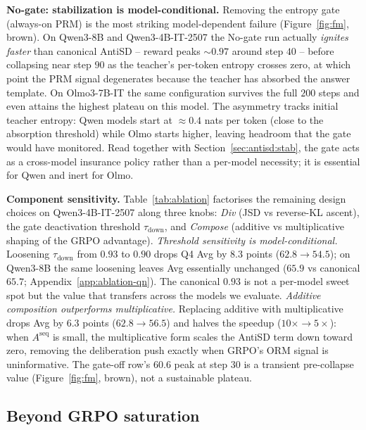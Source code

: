 \documentclass{article}
\begin{document}
\textbf{No-gate: stabilization is model-conditional.} Removing the entropy gate (always-on PRM) is the most striking model-dependent failure (Figure~\ref{fig:fm}, brown). On Qwen3-8B and Qwen3-4B-IT-2507 the No-gate run actually \emph{ignites faster} than canonical AntiSD -- reward peaks $\sim 0.97$ around step $40$ -- before collapsing near step $90$ as the teacher's per-token entropy crosses zero, at which point the PRM signal degenerates because the teacher has absorbed the answer template. On Olmo3-7B-IT the same configuration survives the full $200$ steps and even attains the highest plateau on this model. The asymmetry tracks initial teacher entropy: Qwen models start at $\approx 0.4$ nats per token (close to the absorption threshold) while Olmo starts higher, leaving headroom that the gate would have monitored. Read together with Section~\ref{sec:antisd:stab}, the gate acts as a cross-model insurance policy rather than a per-model necessity; it is essential for Qwen and inert for Olmo.



\textbf{Component sensitivity.} Table~\ref{tab:ablation} factorises the remaining design choices on Qwen3-4B-IT-2507 along three knobs: \emph{Div} (JSD vs reverse-KL ascent), the gate deactivation threshold $\tau_{\mathrm{down}}$, and \emph{Compose} (additive vs multiplicative shaping of the GRPO advantage). \emph{Threshold sensitivity is model-conditional.} Loosening $\tau_{\mathrm{down}}$ from $0.93$ to $0.90$ drops Q4 Avg by $8.3$ points ($62.8 \to 54.5$); on Qwen3-8B the same loosening leaves Avg essentially unchanged ($65.9$ vs canonical $65.7$; Appendix~\ref{app:ablation-qn}). The canonical $0.93$ is not a per-model sweet spot but the value that transfers across the models we evaluate. \emph{Additive composition outperforms multiplicative.} Replacing additive with multiplicative drops Avg by $6.3$ points ($62.8 \to 56.5$) and halves the speedup ($10\times \to 5\times$): when $A^{\mathrm{seq}}$ is small, the multiplicative form scales the AntiSD term down toward zero, removing the deliberation push exactly when GRPO's ORM signal is uninformative. The gate-off row's $60.6$ peak at step $30$ is a transient pre-collapse value (Figure~\ref{fig:fm}, brown), not a sustainable plateau.

\subsection{Beyond GRPO saturation}
\label{sec:exp:continual}
\vspace{-0.5em}
\end{document}
